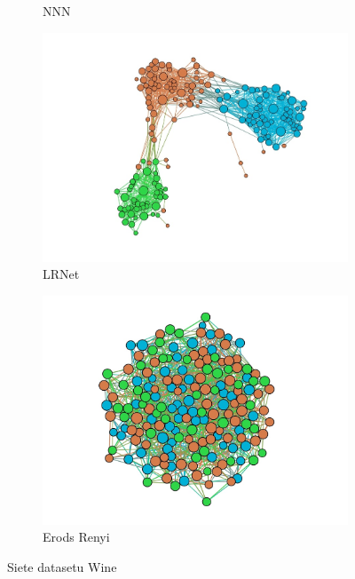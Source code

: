 \documentclass[slovak,master,dept460,male,cpp,cpdeclaration]{diploma}
\begin{document}
\begin{figure}[H]
\begin{subfigure}{0.45\textwidth}
    \caption{NNN}
    \label{fig:wine_nnn}
\end{subfigure}
\medskip
\begin{subfigure}{0.45\textwidth}
    \centering
    \includegraphics[width=\linewidth, frame]{Graphs/network_wine_lrnet.jpg}
    \caption{LRNet}
    \label{fig:wine_lrnet}
\end{subfigure}\hfil
\begin{subfigure}{0.45\textwidth}
    \centering
    \includegraphics[width=\linewidth, frame]{Graphs/network_wine_erdos_renyi.jpg}
    \caption{Erods Renyi}
    \label{fig:wine_erdos_renyi}
\end{subfigure}
\caption{Siete datasetu Wine}
\label{fig:wine_networks}
\end{figure}
\end{document}
